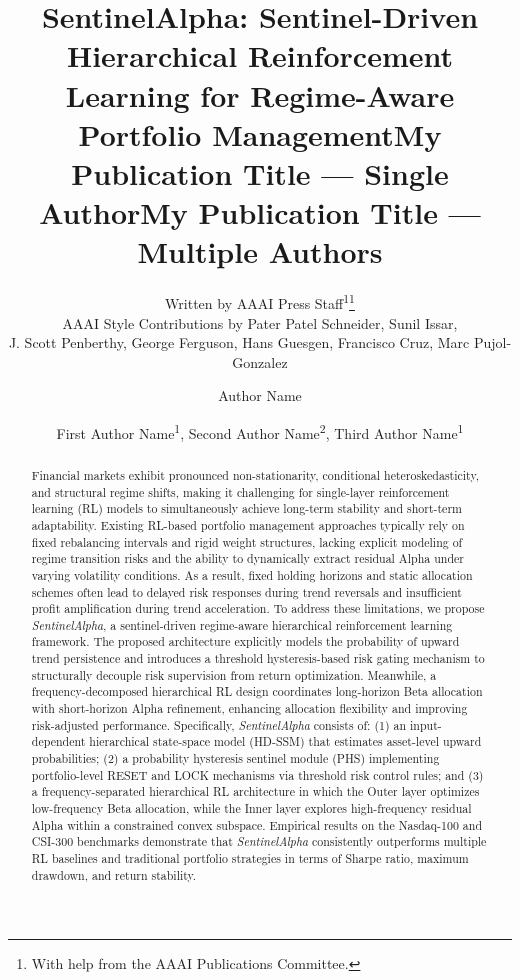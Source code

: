 \documentclass[letterpaper]{article} %
\title{SentinelAlpha: Sentinel-Driven Hierarchical Reinforcement Learning for Regime-Aware Portfolio Management}
\author{
    Written by AAAI Press Staff\textsuperscript{\rm 1}\thanks{With help from the AAAI Publications Committee.}\\
    AAAI Style Contributions by Pater Patel Schneider,
    Sunil Issar,\\
    J. Scott Penberthy,
    George Ferguson,
    Hans Guesgen,
    Francisco Cruz\equalcontrib,
    Marc Pujol-Gonzalez\equalcontrib
}
\title{My Publication Title --- Single Author}
\author {
    Author Name
}
\title{My Publication Title --- Multiple Authors}
\author {
    First Author Name\textsuperscript{\rm 1},
    Second Author Name\textsuperscript{\rm 2},
    Third Author Name\textsuperscript{\rm 1}
}
\begin{document}
\maketitle

\begin{abstract}
Financial markets exhibit pronounced non-stationarity, conditional heteroskedasticity, and structural regime shifts, making it challenging for single-layer reinforcement learning (RL) models to simultaneously achieve long-term stability and short-term adaptability. Existing RL-based portfolio management approaches typically rely on fixed rebalancing intervals and rigid weight structures, lacking explicit modeling of regime transition risks and the ability to dynamically extract residual Alpha under varying volatility conditions. As a result, fixed holding horizons and static allocation schemes often lead to delayed risk responses during trend reversals and insufficient profit amplification during trend acceleration.
To address these limitations, we propose \textit{SentinelAlpha}, a sentinel-driven regime-aware hierarchical reinforcement learning framework. The proposed architecture explicitly models the probability of upward trend persistence and introduces a threshold hysteresis-based risk gating mechanism to structurally decouple risk supervision from return optimization. Meanwhile, a frequency-decomposed hierarchical RL design coordinates long-horizon Beta allocation with short-horizon Alpha refinement, enhancing allocation flexibility and improving risk-adjusted performance.
Specifically, \textit{SentinelAlpha} consists of:
(1) an input-dependent hierarchical state-space model (HD-SSM) that estimates asset-level upward probabilities;
(2) a probability hysteresis sentinel module (PHS) implementing portfolio-level RESET and LOCK mechanisms via threshold risk control rules; and
(3) a frequency-separated hierarchical RL architecture in which the Outer layer optimizes low-frequency Beta allocation, while the Inner layer explores high-frequency residual Alpha within a constrained convex subspace.
Empirical results on the Nasdaq-100 and CSI-300 benchmarks demonstrate that \textit{SentinelAlpha} consistently outperforms multiple RL baselines and traditional portfolio strategies in terms of Sharpe ratio, maximum drawdown, and return stability.
\end{abstract}

\end{document}
